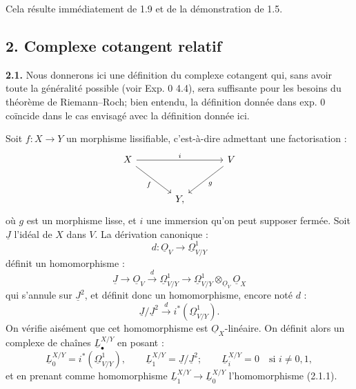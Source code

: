 

Cela résulte immédiatement de 1.9 et de la démonstration de 1.5.

\subsection*{2. Complexe cotangent relatif}

\textbf{2.1.} Nous donnerons ici une définition du complexe cotangent qui, sans avoir toute la généralité possible (voir Exp. 0 4.4), sera suffisante pour les besoins du théorème de Riemann--Roch; bien entendu, la définition donnée dans exp. 0 coïncide dans le cas envisagé avec la définition donnée ici.

Soit $f:X\to Y$ un morphisme lissifiable, c'est-à-dire admettant une factorisation :
\[
\begin{tikzcd}[column sep=large,row sep=large]
X \arrow[rr,"i"] \arrow[dr,"f"'] && V \arrow[dl,"g"]\\
& Y, &
\end{tikzcd}
\]
où $g$ est un morphisme lisse, et $i$ une immersion qu'on peut supposer fermée. Soit $\underline{J}$ l'idéal de $X$ dans $V$. La dérivation canonique :
\[
d:\underline{O}_V\longrightarrow\underline{\Omega}^1_{V/Y}
\]
définit un homomorphisme :
\[
\underline{J}\longrightarrow\underline{O}_V\xrightarrow{d}\underline{\Omega}^1_{V/Y}\longrightarrow
\underline{\Omega}^1_{V/Y}\otimes_{\underline{O}_V}\underline{O}_X
\]
qui s'annule sur $\underline{J}^2$, et définit donc un homomorphisme, encore noté $d$ :
\begin{equation}\tag{2.1.1}
\underline{J}/\underline{J}^2\xrightarrow{d} i^*(\underline{\Omega}^1_{V/Y}).
\end{equation}
On vérifie aisément que cet homomorphisme est $\underline{O}_X$-linéaire. On définit alors un complexe de chaînes $\underline{L}^{X/Y}_\bullet$ en posant :
\[
\underline{L}^{X/Y}_0=i^*(\underline{\Omega}^1_{V/Y}),\qquad
\underline{L}^{X/Y}_1=\underline{J}/\underline{J}^2;
\qquad
\underline{L}^{X/Y}_i=0\quad\text{si }i\neq0,1,
\]
et en prenant comme homomorphisme $\underline{L}^{X/Y}_1\to \underline{L}^{X/Y}_0$ l'homomorphisme (2.1.1).

